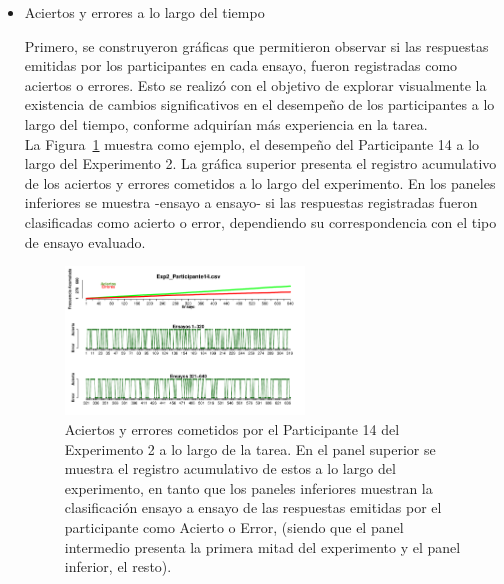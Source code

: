 \begin{itemize}
\item Aciertos y errores a lo largo del tiempo

Primero, se construyeron gráficas que permitieron observar si las respuestas emitidas por los participantes en cada ensayo, fueron registradas como aciertos o errores. Esto se realizó con el objetivo de explorar visualmente la existencia de cambios significativos en el desempeño de los participantes a lo largo del tiempo, conforme adquirían más experiencia en la tarea.\\

La Figura~\ref{fig:Success_E2_P14} muestra como ejemplo, el desempeño del Participante 14 a lo largo del Experimento 2. La gráfica superior presenta el registro acumulativo de los aciertos y errores cometidos a lo largo del experimento. En los paneles inferiores se muestra -ensayo a ensayo- si las respuestas registradas fueron clasificadas como acierto o error, dependiendo su correspondencia con el tipo de ensayo evaluado.\\

\begin{figure}[th]
\centering
\includegraphics[width=0.60\textwidth]{Figures/Success_Exp2_P14}
\caption[Aciertos y errores a lo largo del tiempo: Participante ejemplar]{Aciertos y errores cometidos por el Participante 14 del Experimento 2 a lo largo de la tarea. En el panel superior se muestra el registro acumulativo de estos a lo largo del experimento, en tanto que los paneles inferiores muestran la clasificación ensayo a ensayo de las respuestas emitidas por el participante como Acierto o Error, (siendo que el panel intermedio presenta la primera mitad del experimento y el panel inferior, el resto).}
\label{fig:Success_E2_P14}
\end{figure}




\end{itemize}
